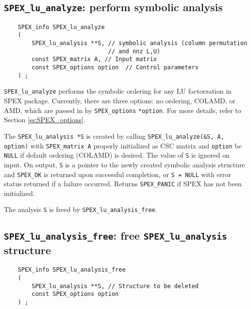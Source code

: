 \documentclass[12pt]{report}
\theoremstyle{definition}
\begin{document}
\cprotect\subsection{\verb|SPEX_lu_analyze|: perform symbolic analysis}
\label{s:SPEX_lu_analyze}

\begin{mdframed}[userdefinedwidth=6in]
{\footnotesize
\begin{verbatim}
    SPEX_info SPEX_lu_analyze
    (
        SPEX_lu_analysis **S, // symbolic analysis (column permutation
                              // and nnz L,U)
        const SPEX_matrix A, // Input matrix
        const SPEX_options option  // Control parameters
    ) ;
\end{verbatim}
} \end{mdframed}

\verb|SPEX_lu_analyze| performs the symbolic ordering for any LU factorzation in SPEX package. Currently,
there are three options: no ordering, COLAMD, or AMD, which are passed in by
\verb|SPEX_options| \verb|*option|. For more details, refer to
Section \ref{ss:SPEX_options}.

The \verb|SPEX_lu_analysis *S| is created by calling
\verb|SPEX_lu_analyze(&S, A, option)| with \verb|SPEX_matrix A| properly
initialized as CSC matrix and \verb|option| be \verb|NULL| if default ordering
(COLAMD) is desired. The value of \verb|S| is ignored on input.  On output,
\verb|S| is a pointer to the newly created symbolic analysis structure and
\verb|SPEX_OK| is returned upon successful completion, or \verb|S = NULL| with
error status returned if a failure occurred.  Returns \verb|SPEX_PANIC| if SPEX
has not been initialized.

The analysis \verb|S| is freed by \verb|SPEX_lu_analysis_free|.

\newpage
\cprotect\subsection{\verb|SPEX_lu_analysis_free|: free \verb|SPEX_lu_analysis| structure}
\label{ss:LU_analysis_free}

\begin{mdframed}[userdefinedwidth=6in]
{\footnotesize
\begin{verbatim}
    SPEX_info SPEX_lu_analysis_free
    (
        SPEX_lu_analysis **S, // Structure to be deleted
        const SPEX_options option
    ) ;
\end{verbatim}
} \end{mdframed}
\end{document}
